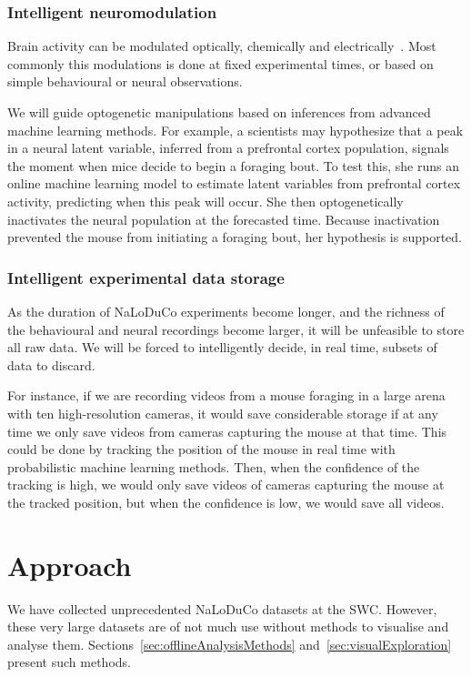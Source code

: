 \documentclass[12pt]{article}
\begin{document}
\subsubsection*{Intelligent neuromodulation}

Brain activity can be modulated optically, chemically and
electrically~\citep{}.
%
Most commonly this modulations is done at fixed experimental times, or based on
simple behavioural or neural observations.

We will guide optogenetic manipulations based on inferences from advanced
machine learning methods.
%
For example, a scientists may hypothesize that a peak in a neural latent
variable, inferred from a prefrontal cortex population, signals the moment when
mice decide to begin a foraging bout.  To test this, she runs an online machine
learning model to estimate latent variables from prefrontal cortex activity,
predicting when this peak will occur. She then optogenetically inactivates the
neural population at the forecasted time.  Because inactivation prevented the
mouse from initiating a foraging bout, her hypothesis is supported.

\subsubsection*{Intelligent experimental data storage}

As the duration of NaLoDuCo experiments become longer, and the richness of the
behavioural and neural recordings become larger, it will be unfeasible to
store all raw data. We will be forced to intelligently decide, in real time,
subsets of data to discard.

For instance, if we are recording videos from a mouse foraging in a large arena
with ten high-resolution cameras, it would save considerable storage if at any
time we only save videos from cameras capturing the mouse at that time.  This
could be done by tracking the position of the mouse in real time with
probabilistic machine learning methods. Then, when the confidence of the
tracking is high, we would only save videos of cameras capturing the mouse at
the tracked position, but when the confidence is low, we would save all videos.

\section{Approach}

We have collected unprecedented NaLoDuCo datasets at the SWC. However, these
very large datasets are of not much use without methods to visualise and
analyse them.
Sections~\ref{sec:offlineAnalysisMethods}
and~\ref{sec:visualExploration}
present such methods.
\end{document}
